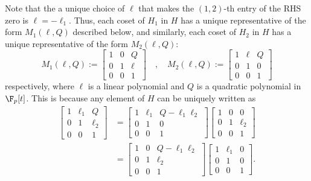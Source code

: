 \documentclass[11pt]{article}
\begin{document}
Note that the a unique choice of $\ell$ that makes the $(1,2)$-th entry of the RHS zero is $\ell = -\ell_1$. Thus, each coset of $H_1$ in $H$ has a unique representative of the form $M_1(\ell,Q)$ described below, and similarly, each coset of $H_2$ %
in  %
%
$H$ has a unique representative of the form $M_2(\ell,Q)$: %
\[
M_1(\ell,Q) :=   \begin{bmatrix}
    1 & 0 & Q\\
    0 & 1 & \ell\\
    0 & 0 & 1
  \end{bmatrix} \quad,\quad M_2(\ell,Q) :=   \begin{bmatrix}
    1 & \ell & Q\\
    0 & 1 & 0\\
    0 & 0 & 1
  \end{bmatrix}
\]
respectively, %
where $\ell$ is a linear polynomial and $Q$ is a quadratic polynomial in $\F_p[t]$. %
%
This is because %
any element  %
of $H$ can be uniquely written as %
\begin{align*}
  \begin{bmatrix}
    1 & \ell_1 & Q\\
    0 & 1 & \ell_2\\
    0 & 0 & 1
  \end{bmatrix} & = \begin{bmatrix}
    1 & \ell_1 & Q - \ell_1\ell_2\\
    0 & 1 & 0\\
    0 & 0 & 1
  \end{bmatrix}\begin{bmatrix}
    1 & 0 & 0\\
    0 & 1 & \ell_2\\
    0 & 0 & 1
  \end{bmatrix}\\
  &= \begin{bmatrix}
    1 & 0 & Q - \ell_1\ell_2\\
    0 & 1 & \ell_2\\
    0 & 0 & 1
  \end{bmatrix}
  \begin{bmatrix}
    1 & \ell_1 & 0\\
    0 & 1 & 0\\
    0 & 0 & 1
  \end{bmatrix}.
\end{align*}
\end{document}
